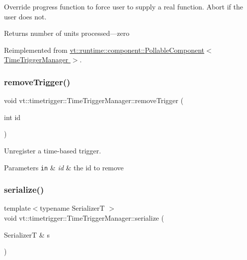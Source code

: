 Override progress function to force user to supply a real function. Abort if the user does not. 

\begin{DoxyReturn}{Returns}
number of units processed---zero 
\end{DoxyReturn}


Reimplemented from \hyperlink{structvt_1_1runtime_1_1component_1_1_pollable_component_a51939e8b7e895a377c10c6767034396b}{vt\+::runtime\+::component\+::\+Pollable\+Component$<$ Time\+Trigger\+Manager $>$}.

\mbox{\label{structvt_1_1timetrigger_1_1_time_trigger_manager_ae6bdddd787aa88b714686270587e1ff5}} 
\subsubsection{\texorpdfstring{remove\+Trigger()}{removeTrigger()}}
{\footnotesize\ttfamily void vt\+::timetrigger\+::\+Time\+Trigger\+Manager\+::remove\+Trigger (\begin{DoxyParamCaption}\item[{int}]{id }\end{DoxyParamCaption})}



Unregister a time-\/based trigger. 


\begin{DoxyParams}[1]{Parameters}
\mbox{\tt in}  & {\em id} & the {\ttfamily id} to remove \\
\hline
\end{DoxyParams}
\mbox{\label{structvt_1_1timetrigger_1_1_time_trigger_manager_a2ae1e322a7f8ad4799060158c43acf27}} 
\subsubsection{\texorpdfstring{serialize()}{serialize()}}
{\footnotesize\ttfamily template$<$typename SerializerT $>$ \\
void vt\+::timetrigger\+::\+Time\+Trigger\+Manager\+::serialize (\begin{DoxyParamCaption}\item[{SerializerT \&}]{s }\end{DoxyParamCaption})\hspace{0.3cm}{\ttfamily [inline]}}

